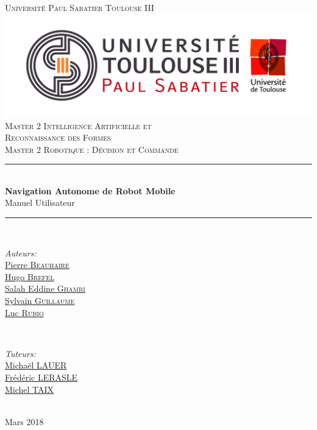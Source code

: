 \documentclass[10pt,a4paper]{article}
\begin{document}
\pagestyle {plain}

\begin{titlepage}


\newcommand{\HRule}{\rule{\linewidth}{0.5mm}} 

\center

\textsc{\Large Université Paul Sabatier Toulouse III}\\[1cm] 
\includegraphics[scale=0.3]{UPS.jpg}\\[0.6cm] 


\textsc{Master 2 Intelligence Artificielle et \\ 
Reconnaissance des Formes \\ Master 2 Robotique : Décision et Commande}\\[3cm] 

\HRule \\[0.4cm]
{ \huge \bfseries Navigation Autonome de Robot Mobile}\\[0.4cm] 
\LARGE Manuel Utilisateur

\HRule \\[1.5cm]
 

\begin{minipage}{0.4\textwidth}
\begin{flushleft} \large
\emph{Auteurs:}\\
\href{mailto:beauhaire.pierre@gmail.com}{Pierre \textsc{Beauhaire} }  \\
\href{mailto:brefel.hugo@gmail.com}{Hugo \textsc{Brefel} }  \\
\href{mailto:salaheddineghamri@gmail.com}{Salah Eddine \textsc{Ghamri} } \\
\href{mailto:sylvain31g@free.fr}{Sylvain \textsc{Guillaume} } \\
\href{mailto:luc.rubio.lr@gmail.com}{Luc \textsc{Rubio} } 
\end{flushleft}
\end{minipage}
~
\begin{minipage}{0.4\textwidth}
\begin{flushright} \large
\emph{Tuteurs:} \\
\href{mailto:michael.lauer@laas.fr}{Michaël \textsc{LAUER}} \\
\href{mailto:lerasle@laas.fr}{Frédéric \textsc{LERASLE}}\\
\href{mailto:taix@laas.f}{Michel \textsc{TAIX}}
\end{flushright}
\end{minipage}\\[5cm]


\large Mars 2018
 

\end{titlepage}
\end{document}

